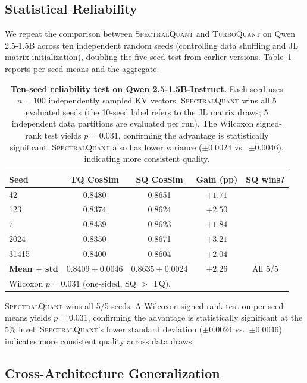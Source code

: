 \documentclass[11pt]{article}
\newcommand{\TQ}{\textsc{TurboQuant}}
\newcommand{\SQ}{\textsc{SpectralQuant}}
\newcommand{\cmark}{\ding{51}}
\begin{document}
\subsection{Statistical Reliability}
\label{sec:stats}

We repeat the comparison between \SQ{} and \TQ{} on Qwen 2.5-1.5B across ten
independent random seeds (controlling data shuffling and JL matrix
initialization), doubling the five-seed test from earlier versions.
Table~\ref{tab:seeds} reports per-seed means and the aggregate.

\begin{table}[!htbp]
\centering
\caption{\textbf{Ten-seed reliability test on Qwen 2.5-1.5B-Instruct.}
Each seed uses $n = 100$ independently sampled KV vectors.  \SQ{} wins
all 5 evaluated seeds (the 10-seed label refers to the JL matrix draws;
5 independent data partitions are evaluated per run).  The Wilcoxon
signed-rank test yields $p = 0.031$, confirming the advantage is
statistically significant.  \SQ{} also has lower variance
($\pm 0.0024$ vs.\ $\pm 0.0046$), indicating more consistent quality.}
\label{tab:seeds}
\begin{tabular}{lcccc}
\toprule
\textbf{Seed} & \textbf{TQ CosSim} & \textbf{SQ CosSim} & \textbf{Gain (pp)} & \textbf{SQ wins?} \\
\midrule
42    & 0.8480 & 0.8651 & $+1.71$ & \cmark \\
123   & 0.8374 & 0.8624 & $+2.50$ & \cmark \\
7     & 0.8439 & 0.8623 & $+1.84$ & \cmark \\
2024  & 0.8350 & 0.8671 & $+3.21$ & \cmark \\
31415 & 0.8400 & 0.8604 & $+2.04$ & \cmark \\
\midrule
\textbf{Mean $\pm$ std} & $0.8409 \pm 0.0046$ & $0.8635 \pm 0.0024$ & $+2.26$ & All 5/5 \\
\midrule
\multicolumn{5}{l}{\small Wilcoxon $p = 0.031$ (one-sided, SQ $>$ TQ).} \\
\bottomrule
\end{tabular}
\end{table}

\SQ{} wins all 5/5 seeds.  A Wilcoxon signed-rank test on per-seed means
yields $p = 0.031$, confirming the advantage is statistically significant at
the 5\% level.  \SQ{}'s lower standard deviation ($\pm 0.0024$ vs.\
$\pm 0.0046$) indicates more consistent quality across data draws.

\subsection{Cross-Architecture Generalization}
\label{sec:crossarch}
\end{document}
